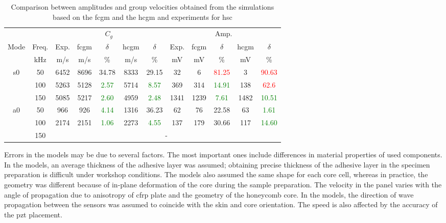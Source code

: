 \documentclass[11pt,a4paper,final]{report}
\theoremstyle{plain}
\begin{document}
\begin{table}[!htb]
	\small
	\tabcolsep=0.15cm
	\centering
	\caption{\label{tab:group_velocity_hsc} Comparison between amplitudes and group velocities obtained from the simulations based on the \acf{fcgm} and the \acf{hcgm} and experiments for \acl{hsc}}
	\begin{tabular}{cccccccccccc}
		\toprule
		& & \multicolumn{5}{c}{\(C_g\)} & \multicolumn{5}{c}{Amp.}\\
		\multirow{2}{*}{Mode} & Freq.& Exp. & \ac{fcgm} & \(\delta\) & \ac{hcgm} & \(\delta\) &  Exp. & \ac{fcgm} & \(\delta\) & \ac{hcgm} & \(\delta\)\\
		& \unit{\kHz} & \unit[per-mode = symbol]{\m\per\s} & \unit[per-mode = symbol]{\m\per\s} & \% & \unit[per-mode = symbol]{\m\per\s} & \% & \unit{\mV} & \unit{\mV} & \%& \unit{\mV} & \% \\
		\midrule
		\multirow{3}{*}{\ac{s0}} & 50 & 6452 & 8696 & {34.78} & 8333 & {29.15} & 32 & 6 & \textcolor{red}{81.25} & 3 & \textcolor{red}{90.63}\\
		&100& 5263 & 5128 & \textcolor{green}{2.57} & 5714 & \textcolor{green}{8.57} & 369 & 314 & \textcolor{green}{14.91} & 138 & \textcolor{red}{62.6}\\
		&150& 5085 & 5217 & \textcolor{green}{2.60} & 4959 & \textcolor{green}{2.48} & 1341 & 1239 & \textcolor{green}{7.61} & 1482 & \textcolor{green}{10.51}\\
		\midrule
		\multirow{3}{*}{\ac{a0}} & 50 & 966 & 926 & \textcolor{green}{4.14} & 1316 & {36.23} & 62 & 76 & {22.58} & 63 & \textcolor{green}{1.61}\\
		& 100 & 2174 & 2151 & \textcolor{green}{1.06} & 2273 & \textcolor{green}{4.55} & 137 & 179 & {30.66} & 117 & \textcolor{green}{14.60}\\
		& 150 & \multicolumn{10}{c}{-}\\
		\bottomrule
	\end{tabular}
\end{table}
Errors in the models may be due to several factors.
The most important ones include differences in material properties of used components.
In the models, an average thickness of the adhesive layer was assumed; obtaining precise thickness of the adhesive layer in the specimen preparation is difficult under workshop conditions.
The models also assumed the same shape for each core cell, whereas in practice, the geometry was different because of in-plane deformation of the core during the sample preparation.
The velocity in the panel varies with the angle of propagation due to anisotropy of \ac{cfrp} plate and the geometry of the honeycomb core.
In the models, the direction of wave propagation between the sensors was assumed to coincide with the skin and core orientation.
The speed is also affected by the accuracy of the \ac{pzt} placement. 
\end{document}

